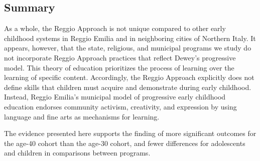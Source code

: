 \subsection{Summary}

As a whole, the Reggio Approach is not unique compared to other early childhood systems in Reggio Emilia and in neighboring cities of Northern Italy. It appears, however, that the state, religious, and municipal programs we study do not incorporate Reggio Approach practices that reflect Dewey's progressive model. This theory of education prioritizes the process of learning over the learning of specific content. Accordingly, the Reggio Approach explicitly does not define skills that children must acquire and demonstrate during early childhood. Instead, Reggio Emilia's municipal model of progressive early childhood education endorses community activism, creativity, and expression by using language and fine arts as mechanisms for learning. 

The evidence presented here supports the finding of more significant outcomes for the age-40 cohort than the age-30 cohort, and fewer differences for adolescents and children in comparisons between programs. 
